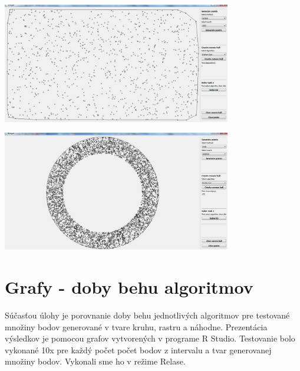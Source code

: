 \documentclass[12pt]{article}
\begin{document}
\begin{center}
   \includegraphics[width=10cm]{./img/CH_points_generate_random_1000.png}
\end{center}
\clearpage
\begin{center}
   \includegraphics[width=10cm]{./img/milion_points.png}
\end{center}

\clearpage 
\section{Grafy - doby behu algoritmov}
Súčasťou úlohy je porovnanie doby behu jednotlivých algoritmov pre testované množiny bodov generované v tvare kruhu, rastru a náhodne. Prezentácia výsledkov je pomocou grafov vytvorených v programe R Studio. Testovanie bolo vykonané 10x pre každý počet počet bodov z intervalu a tvar generovanej množiny bodov. Vykonali sme ho v režime Relase.
\end{document}
